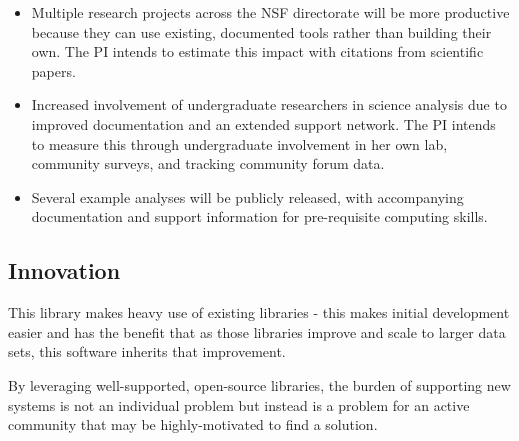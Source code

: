 \begin{itemize}
    \item Multiple research projects across the NSF directorate will be more productive because they can use existing, documented tools rather than building their own.  The PI intends to estimate this impact with citations from scientific papers.
    \item Increased involvement of undergraduate researchers in science analysis due to improved documentation and an extended support network.  The PI intends to measure this through undergraduate involvement in her own lab, community surveys, and tracking community forum data.
    \item Several example analyses will be publicly released, with accompanying documentation and support information for pre-requisite computing skills.  %
\end{itemize}


\subsection{Innovation}


This library makes heavy use of existing libraries - this makes initial development easier and has the benefit  that as those libraries improve and scale to larger data sets, this software inherits that improvement.  

By leveraging well-supported, open-source libraries, the burden of supporting new systems is not an individual problem but instead is a problem for an active community that may be highly-motivated to find a solution.  %

